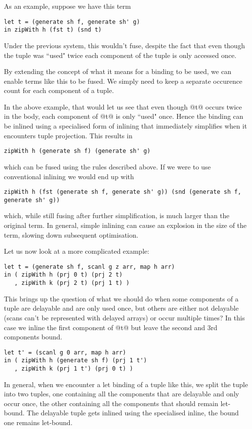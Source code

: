 As an example, suppose we have this term

\begin{lstlisting}
let t = (generate sh f, generate sh' g)
in zipWith h (fst t) (snd t)
\end{lstlisting}
%
Under the previous system, this wouldn't fuse, despite the fact that even though the tuple was ``used" twice each component of the tuple is only accessed once.

By extending the concept of what it means for a binding to be used, we can enable terms like this to be fused. We simply need to keep a separate occurence count for each component of a tuple.

In the above example, that would let us see that even though @t@ occurs twice in the body, each component of @t@ is only ``used" once. Hence the binding can be inlined using a specialised form of inlining that immediately simplifies when it encounters tuple projection. This results in
%
\begin{lstlisting}
zipWith h (generate sh f) (generate sh' g)
\end{lstlisting}
%
which can be fused using the rules described above. If we were to use conventional inlining we would end up with
%
\begin{lstlisting}
zipWith h (fst (generate sh f, generate sh' g)) (snd (generate sh f, generate sh' g))
\end{lstlisting}
%
which, while still fusing after further simplification, is much larger than the original term. In general, simple inlining can cause an explosion in the size of the term, slowing down subsequent optimisation.

Let us now look at a more complicated example:
%
\begin{lstlisting}
let t = (generate sh f, scanl g z arr, map h arr)
in ( zipWith h (prj 0 t) (prj 2 t)
   , zipWith k (prj 2 t) (prj 1 t) )
\end{lstlisting}
%
This brings up the question of what we should do when some components of a tuple are delayable and are only used once, but others are either not delayable (scans can't be represented with delayed arrays) or occur multiple times? In this case we inline the first component of @t@ but leave the second and 3rd components bound.
%
\begin{lstlisting}
let t' = (scanl g 0 arr, map h arr)
in ( zipWith h (generate sh f) (prj 1 t')
   , zipWith k (prj 1 t') (prj 0 t) )
\end{lstlisting}
%
In general, when we encounter a let binding of a tuple like this, we split the tuple into two tuples, one containing all the components that are delayable and only occur once, the other containing all the components that should remain let-bound. The delayable tuple gets inlined using the specialised inline, the bound one remains let-bound.

